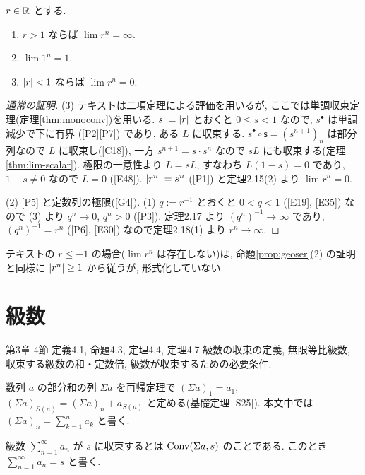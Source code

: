 \begin{prop}\label{prop:geo}
  $r \in \mathbb{R}$ とする.
  \begin{enumerate}[label=(\arabic*)]
    \item $r > 1$ ならば $\lim r^n = \infty$.
    \item $\lim 1^n = 1$.
    \item $\lvert r\rvert < 1$ ならば $\lim r^n = 0$.
  \end{enumerate}
\end{prop}
\begin{proof}[通常の証明]
  (3) テキストは二項定理による評価を用いるが, ここでは単調収束定理(定理\ref{thm:monoconv})を用いる. $s := \lvert r\rvert$ とおくと $0 \leq s < 1$ なので, $s^\bullet$ は単調減少で下に有界 ([P2][P7]) であり, ある $L$ に収束する. $s^\bullet \circ \mathsf{s} = (s^{n+1})_n$ は部分列なので $L$ に収束し([C18]), 一方 $s^{n+1} = s \cdot s^n$ なので $sL$ にも収束する(定理\ref{thm:lim-scalar}). 極限の一意性より $L = sL$, すなわち $L(1 - s) = 0$ であり, $1 - s \neq 0$ なので $L = 0$ ([E48]). $\lvert r^n\rvert = s^n$ ([P1]) と定理2.15(2) より $\lim r^n = 0$.

  (2) [P5] と定数列の極限([G4]). (1) $q := r^{-1}$ とおくと $0 < q < 1$ ([E19], [E35]) なので (3) より $q^n \to 0$, $q^n > 0$ ([P3]). 定理2.17 より $(q^n)^{-1} \to \infty$ であり, $(q^n)^{-1} = r^n$ ([P6], [E30]) なので定理2.18(1) より $r^n \to \infty$.
\end{proof}

テキストの $r \leq -1$ の場合($\lim r^n$ は存在しない)は, 命題\ref{prop:geoser}(2) の証明と同様に $\lvert r^n\rvert \geq 1$ から従うが, 形式化していない.

\section{級数}

\begin{textref}{第3章 4節 定義4.1, 命題4.3, 定理4.4, 定理4.7}
  級数の収束の定義, 無限等比級数, 収束する級数の和・定数倍, 級数が収束するための必要条件.
\end{textref}

数列 $a$ の部分和の列 $\Sigma a$ を再帰定理で $(\Sigma a)_1 = a_1$, $(\Sigma a)_{S(n)} = (\Sigma a)_n + a_{S(n)}$ と定める(基礎定理 [S25]). 本文中では $(\Sigma a)_n = \sum_{k=1}^n a_k$ と書く.

\begin{dfn}[テキスト定義4.1]
  級数 $\sum_{n=1}^\infty a_n$ が $s$ に収束するとは $\mathrm{Conv}(\Sigma a, s)$ のことである. このとき $\sum_{n=1}^\infty a_n = s$ と書く.
\end{dfn}

